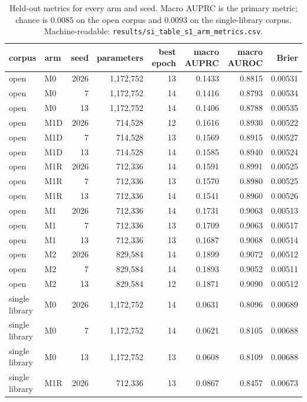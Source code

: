 \documentclass[11pt]{article}
\begin{document}
\begin{table}[htbp]
\centering
\caption{Held-out metrics for every arm and seed. Macro AUPRC is the primary
metric; chance is $0.0085$ on the open corpus and $0.0093$ on the single-library
corpus. Machine-readable: \texttt{results/si\_table\_s1\_arm\_metrics.csv}.}
\label{tab:s1}
\small
\begin{tabular}{l l r r r r r r}
\toprule
corpus & arm & seed & parameters & best epoch & macro AUPRC & macro AUROC & Brier \\
\midrule
open & M0  & 2026 & 1,172,752 & 13 & 0.1433 & 0.8815 & 0.00531 \\
open & M0  & 7    & 1,172,752 & 14 & 0.1416 & 0.8793 & 0.00534 \\
open & M0  & 13   & 1,172,752 & 14 & 0.1406 & 0.8788 & 0.00535 \\
open & M1D & 2026 & 714,528   & 12 & 0.1616 & 0.8930 & 0.00522 \\
open & M1D & 7    & 714,528   & 13 & 0.1569 & 0.8915 & 0.00527 \\
open & M1D & 13   & 714,528   & 14 & 0.1585 & 0.8940 & 0.00524 \\
open & M1R & 2026 & 712,336   & 14 & 0.1591 & 0.8991 & 0.00525 \\
open & M1R & 7    & 712,336   & 13 & 0.1570 & 0.8980 & 0.00525 \\
open & M1R & 13   & 712,336   & 14 & 0.1541 & 0.8960 & 0.00526 \\
open & M1  & 2026 & 712,336   & 14 & 0.1731 & 0.9063 & 0.00513 \\
open & M1  & 7    & 712,336   & 13 & 0.1709 & 0.9063 & 0.00517 \\
open & M1  & 13   & 712,336   & 13 & 0.1687 & 0.9068 & 0.00514 \\
open & M2  & 2026 & 829,584   & 14 & 0.1899 & 0.9072 & 0.00512 \\
open & M2  & 7    & 829,584   & 14 & 0.1893 & 0.9052 & 0.00511 \\
open & M2  & 13   & 829,584   & 12 & 0.1871 & 0.9090 & 0.00512 \\
\midrule
single library & M0  & 2026 & 1,172,752 & 14 & 0.0631 & 0.8096 & 0.00689 \\
single library & M0  & 7    & 1,172,752 & 14 & 0.0621 & 0.8105 & 0.00688 \\
single library & M0  & 13   & 1,172,752 & 13 & 0.0608 & 0.8109 & 0.00688 \\
single library & M1R & 2026 & 712,336   & 13 & 0.0867 & 0.8457 & 0.00673 \\

\end{tabular}
\end{table}
\end{document}
